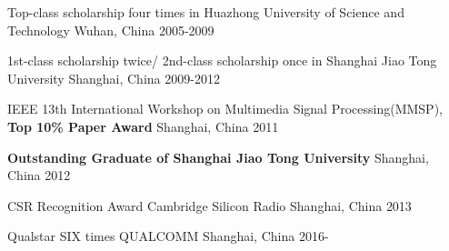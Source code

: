 


\begin{cvhonors}

  \cvhonor
    {} %
    {Top-class scholarship four times in Huazhong University of Science and Technology} %
    {Wuhan, China} %
    {2005-2009} %

  \cvhonor
    {} %
    {1st-class scholarship twice/ 2nd-class scholarship once in Shanghai Jiao Tong University} %
    {Shanghai, China} %
    {2009-2012} %

  \cvhonor
    {} %
    {IEEE 13th International Workshop on Multimedia Signal Processing(MMSP), \textbf{Top 10\% Paper Award}} %
    {Shanghai, China} %
    {2011} %

  \cvhonor
    {} %
    {\textbf{Outstanding Graduate of Shanghai Jiao Tong University}} %
    {Shanghai, China} %
    {2012} %

\end{cvhonors}




\begin{cvhonors}

  \cvhonor
    {CSR Recognition Award} %
    {Cambridge Silicon Radio} %
    {Shanghai, China} %
    {2013} %

  \cvhonor
    {Qualstar SIX times} %
    {QUALCOMM} %
    {Shanghai, China} %
    {2016-} %

\end{cvhonors}
